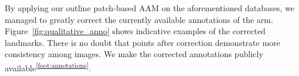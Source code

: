 By applying our outline patch-based AAM on the aforementioned databases, we managed to greatly correct the currently available annotations of the arm. Figure~\ref{fig:qualitative_anno} shows indicative examples of the corrected landmarks. There is no doubt that points after correction demonstrate more consistency among images. We make the corrected annotations publicly available\textsuperscript{\ref{foot:annotations}}.





















